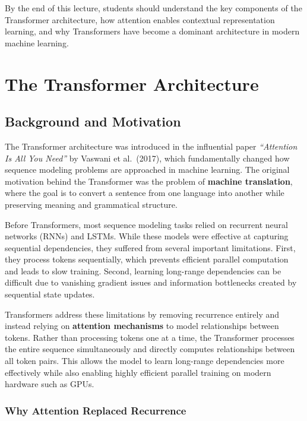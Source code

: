 \documentclass[11pt]{article}
\begin{document}
By the end of this lecture, students should understand the key components of the Transformer architecture, how attention enables contextual representation learning, and why Transformers have become a dominant architecture in modern machine learning.

\section{The Transformer Architecture}

\subsection{Background and Motivation}

The Transformer architecture was introduced in the influential paper \emph{``Attention Is All You Need''} by Vaswani et al.\ (2017), which fundamentally changed how sequence modeling problems are approached in machine learning. The original motivation behind the Transformer was the problem of \textbf{machine translation}, where the goal is to convert a sentence from one language into another while preserving meaning and grammatical structure.

Before Transformers, most sequence modeling tasks relied on recurrent neural networks (RNNs) and LSTMs. While these models were effective at capturing sequential dependencies, they suffered from several important limitations. First, they process tokens sequentially, which prevents efficient parallel computation and leads to slow training. Second, learning long-range dependencies can be difficult due to vanishing gradient issues and information bottlenecks created by sequential state updates.

Transformers address these limitations by removing recurrence entirely and instead relying on \textbf{attention mechanisms} to model relationships between tokens. Rather than processing tokens one at a time, the Transformer processes the entire sequence simultaneously and directly computes relationships between all token pairs. This allows the model to learn long-range dependencies more effectively while also enabling highly efficient parallel training on modern hardware such as GPUs.

\subsubsection{Why Attention Replaced Recurrence}
\end{document}
